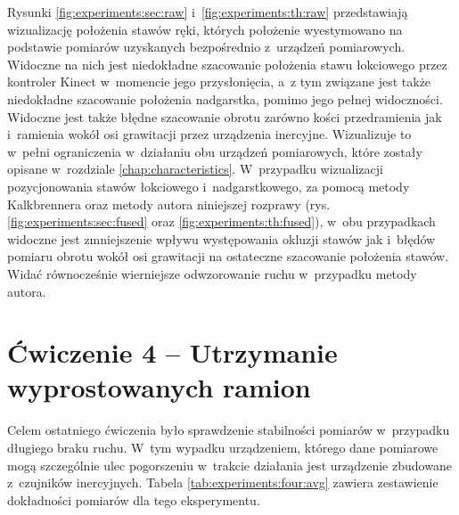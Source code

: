 Rysunki \ref{fig:experiments:sec:raw} i~\ref{fig:experiments:th:raw} przedstawiają wizualizację położenia stawów ręki, których położenie wyestymowano na podstawie pomiarów uzyskanych bezpośrednio z~urządzeń pomiarowych. Widoczne na nich jest niedokładne szacowanie położenia stawu łokciowego przez kontroler Kinect w~momencie jego przysłonięcia, a~z tym związane jest także niedokładne szacowanie położenia nadgarstka, pomimo jego pełnej widoczności. Widoczne jest także błędne szacowanie obrotu zarówno kości przedramienia jak i~ramienia wokół osi grawitacji przez urządzenia inercyjne. Wizualizuje to w~pełni ograniczenia w~działaniu obu urządzeń pomiarowych, które zostały opisane w~rozdziale \ref{chap:characteristics}. W~przypadku wizualizacji pozycjonowania stawów łokciowego i~nadgarstkowego, za pomocą metody Kalkbrennera oraz metody autora niniejszej rozprawy (rys. \ref{fig:experiments:sec:fused} oraz \ref{fig:experiments:th:fused}), w~obu przypadkach widoczne jest zmniejszenie wpływu występowania okluzji stawów jak i~błędów pomiaru obrotu wokół osi grawitacji na ostateczne szacowanie położenia stawów. Widać równocześnie wierniejsze odwzorowanie ruchu w~przypadku metody autora.\\
																				
\section*{Ćwiczenie 4 -- Utrzymanie wyprostowanych ramion}
Celem ostatniego ćwiczenia było sprawdzenie stabilności pomiarów w~przypadku długiego braku ruchu. W~tym wypadku urządzeniem, którego dane pomiarowe mogą szczególnie ulec pogorszeniu w~trakcie działania jest urządzenie zbudowane z~czujników inercyjnych. Tabela \ref{tab:experiments:four:avg} zawiera zestawienie dokładności pomiarów dla tego eksperymentu.
																				
